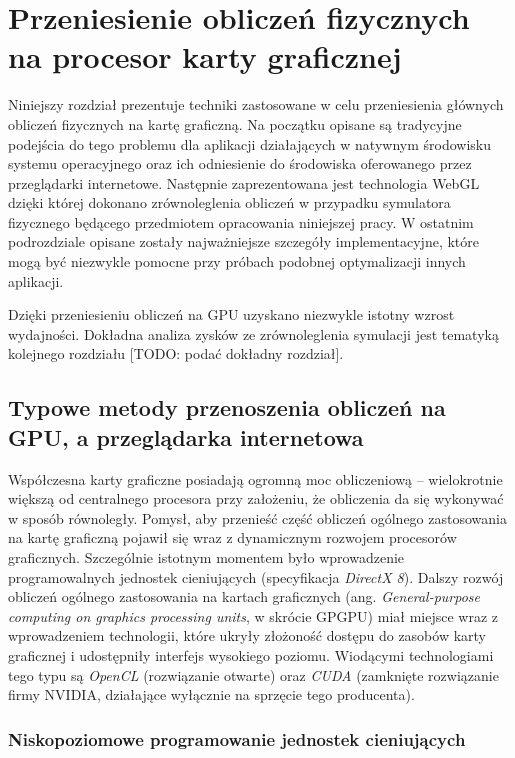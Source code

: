 \chapter{Przeniesienie obliczeń fizycznych na procesor karty graficznej}

Niniejszy rozdział prezentuje techniki zastosowane w celu przeniesienia
głównych obliczeń fizycznych na kartę graficzną. Na początku opisane są
tradycyjne podejścia do tego problemu dla aplikacji działających w natywnym
środowisku systemu operacyjnego oraz ich odniesienie do środowiska oferowanego
przez przeglądarki internetowe. Następnie zaprezentowana jest technologia
\mbox{WebGL} dzięki której dokonano zrównoleglenia obliczeń w przypadku
symulatora fizycznego będącego przedmiotem opracowania niniejszej pracy. W
ostatnim podrozdziale opisane zostały najważniejsze szczegóły implementacyjne,
które mogą być niezwykle pomocne przy próbach podobnej optymalizacji innych
aplikacji.

Dzięki przeniesieniu obliczeń na GPU uzyskano niezwykle istotny wzrost
wydajności. Dokładna analiza zysków ze zrównoleglenia symulacji jest tematyką
kolejnego rozdziału [TODO: podać dokładny rozdział].

\section{Typowe metody przenoszenia obliczeń na GPU, a przeglądarka internetowa}

Współczesna karty graficzne posiadają ogromną moc obliczeniową -- wielokrotnie
większą od centralnego procesora przy założeniu, że obliczenia da się
wykonywać w sposób równoległy. Pomysł, aby przenieść część obliczeń ogólnego
zastosowania na kartę graficzną pojawił się wraz z dynamicznym rozwojem
procesorów graficznych. Szczególnie istotnym momentem było wprowadzenie
programowalnych jednostek cieniujących (specyfikacja \emph{DirectX 8}). Dalszy
rozwój obliczeń ogólnego zastosowania na kartach graficznych (ang. \emph
{General-purpose computing on graphics processing units}, w skrócie GPGPU)
miał miejsce wraz z wprowadzeniem technologii, które ukryły złożoność dostępu
do zasobów karty graficznej i udostępniły interfejs wysokiego poziomu.
Wiodącymi technologiami tego typu są \emph{OpenCL} (rozwiązanie otwarte) oraz
\emph{CUDA} (zamknięte rozwiązanie firmy NVIDIA, działające wyłącznie na
sprzęcie tego producenta).

\subsection{Niskopoziomowe programowanie jednostek cieniujących}


